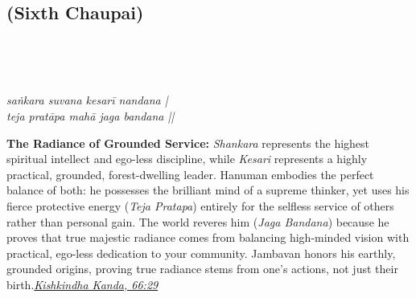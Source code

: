 
\newpage

\subsection*{ (Sixth Chaupai)}

\begin{minipage}[t]{0.55\textwidth}
\vspace{0pt}

{\large \linespread{1.5}\selectfont
{}\\
\par}

\vspace{0.5em}

{\large \linespread{1.5}\selectfont
{}\\
\par}

\vspace{0.5em}

{\large \linespread{1.3}\selectfont
\textit{saṅkara suvana kesarī nandana |}\\
\textit{teja pratāpa mahā jaga bandana ||}
\par}
\end{minipage}%
\hfill
\begin{minipage}[t]{0.42\textwidth}
\vspace{0pt}
\begin{tcolorbox}[anchorbox]
\textbf{The Radiance of Grounded Service:} \textit{Shankara} represents the highest spiritual intellect and ego-less discipline, while \textit{Kesari} represents a highly practical, grounded, forest-dwelling leader. Hanuman embodies the perfect balance of both: he possesses the brilliant mind of a supreme thinker, yet uses his fierce protective energy (\textit{Teja Pratapa}) entirely for the selfless service of others rather than personal gain. The world reveres him (\textit{Jaga Bandana}) because he proves that true majestic radiance comes from balancing high-minded vision with practical, ego-less dedication to your community.
\vspace{0.5em}\newline Jambavan honors his earthly, grounded origins, proving true radiance stems from one's actions, not just their birth.\newline\null\hfill\href{https://www.valmiki.iitk.ac.in/sloka?field_kanda_tid=4&language=dv&field_sarga_value=66}{\textit{Kishkindha Kanda, 66:29}}
\end{tcolorbox}
\end{minipage}

